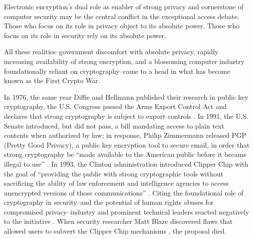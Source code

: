 


Electronic encryption's dual role as enabler of strong privacy and cornerstone of computer security may be the central
conflict in the exceptional access debate. Those who focus on its role in privacy object to its absolute power. Those
who focus on its role in security rely on its absolute power.


All these realities--government discomfort with absolute privacy, rapidly increasing availability of strong encryption,
and a blossoming computer industry foundationally reliant on cryptography--came to a head in what has become known as
the First Crypto War.

In 1976, the same year Diffie and Hellmann published their research in public key cryptography, the U.S. Congress passed
the Arms Export Control Act and declares that strong cryptography is subject to export controls \cite{kehl_right_2015}.
In 1991, the U.S. Senate introduced, but did not pass, a bill mandating access to plain text contents when authorized by
law; in response, Philip Zimmermann released PGP (Pretty Good Privacy), a public key encryption tool to secure email, in
order that strong cryptography be ``made available to the American public before it became illegal to use''
\cite{zimmermann_1996}. In 1993, the Clinton administration introduced Clipper Chip \cite{press_1993} with the goal of
``providing the public with strong cryptographic tools without sacrificing the ability of law enforcement and
intelligence agencies to access unencrypted versions of those communications'' \cite{thompson_2015}. Citing the
foundational role of cryptography in security--and the potential of human rights abuses for compromised
privacy--industry and prominent technical leaders reacted negatively to the initiative \cite{kehl_right_2015}
\cite{zimmermann_1996}. When security researcher Matt Blaze discovered flaws that allowed users to subvert the Clipper
Chip mechanisms \cite{blaze_protocol_1994}, the proposal died.

